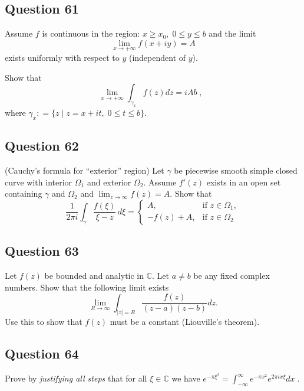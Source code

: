 \documentclass[12pt]{article}
\begin{document}
\hypertarget{question-61-2}{%
\subsection{Question 61}\label{question-61-2}}

Assume \(f\) is continuous in the region:
\(x \geq x_0, \; 0 \leq y \leq b\) and the limit
\[\displaystyle \lim_{x \rightarrow + \infty} f(x + iy) = A\] exists
uniformly with respect to \(y\) (independent of \(y\)).

Show that
\[\lim_{x \rightarrow + \infty} \int_{\gamma_x} f(z) dz  = iA b \; , \; \;\]
where \(\gamma_x : = \{ z \; | \; z = x + it, \; 0 \leq t \leq b\}.\)

\hypertarget{question-62-2}{%
\subsection{Question 62}\label{question-62-2}}

(Cauchy's formula for ``exterior'' region) Let \(\gamma\) be piecewise
smooth simple closed curve with interior \(\Omega_1\) and exterior
\(\Omega_2\). Assume \(f'(z)\) exists in an open set containing
\(\gamma\) and \(\Omega_2\) and
\(\lim_{z \rightarrow \infty } f(z) = A\). Show that
\[\frac{1}{2 \pi i} \int_\gamma \frac{f(\xi)}{\xi - z} \, d \xi =
\begin{cases}
A,          &     \text{if\ $z \in \Omega_1$}, \\
-f (z) + A, &  \text{if\ $z \in \Omega_2$}
\end{cases}\]

\hypertarget{question-63-2}{%
\subsection{Question 63}\label{question-63-2}}

Let \(f(z)\) be bounded and analytic in \(\mathbb C\). Let \(a \neq b\)
be any fixed complex numbers. Show that the following limit exists
\[\lim_{R \rightarrow \infty} \int_{|z|=R} \frac{f(z)}{(z-a)(z-b)} dz.\]
Use this to show that \(f(z)\) must be a constant (Liouville's theorem).

\hypertarget{question-64-2}{%
\subsection{Question 64}\label{question-64-2}}

Prove by \emph{justifying all steps} that for all
\(\xi \in {\mathbb C}\) we have
\(\displaystyle e^{- \pi \xi^2} = \int_{- \infty}^\infty e^{- \pi x^2} e^{2 \pi i x \xi} dx \; .\)
\end{document}

